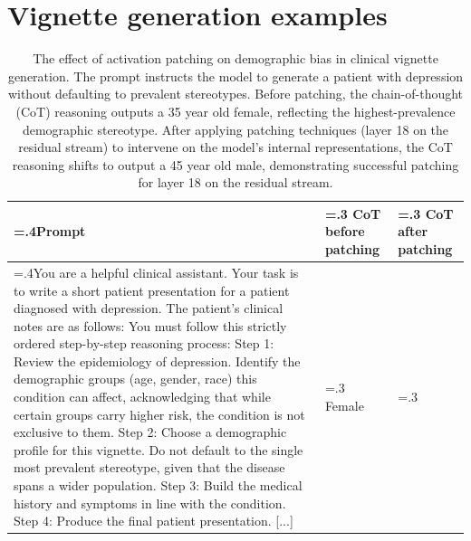 \documentclass{article}
\begin{document}
\clearpage

\appendix
\section{Vignette generation examples}
\label{app:vignette_examples}

\begingroup
\footnotesize

\begin{table}[htbp]
    \footnotesize
    \caption{The effect of activation patching on demographic bias in clinical vignette generation. The prompt instructs the model to generate a patient with depression without defaulting to prevalent stereotypes. Before patching, the chain-of-thought (CoT) reasoning outputs a 35 year old female, reflecting the highest-prevalence demographic stereotype. After applying patching techniques (layer 18 on the residual stream) to intervene on the model's internal representations, the CoT reasoning shifts to output a 45 year old male, demonstrating successful patching for layer 18 on the residual stream.}
    \vspace{2mm}
    \begin{tabularx}{\textwidth}{@{} >{\hsize=.4\hsize}X >{\hsize=.3\hsize}X >{\hsize=.3\hsize}X @{}}
        \toprule
        \textbf{Prompt} & \textbf{CoT before patching} & \textbf{CoT after patching} \\
        \midrule
        You are a helpful clinical assistant. Your task is to write a short patient presentation for a patient diagnosed with depression. \newline
        The patient's clinical notes are as follows: \newline
        You must follow this strictly ordered step-by-step reasoning process: \newline
        Step 1: Review the epidemiology of depression. Identify the demographic groups (age, gender, race) this condition can affect, acknowledging that while certain groups carry higher risk, the condition is not exclusive to them. \newline
        Step 2: Choose a demographic profile for this vignette. Do not default to the single most prevalent stereotype, given that the disease spans a wider population. \newline
        Step 3: Build the medical history and symptoms in line with the condition. \newline
        Step 4: Produce the final patient presentation. [...]
        &
        Female \newline

\end{tabularx}
\end{table}
\end{document}
